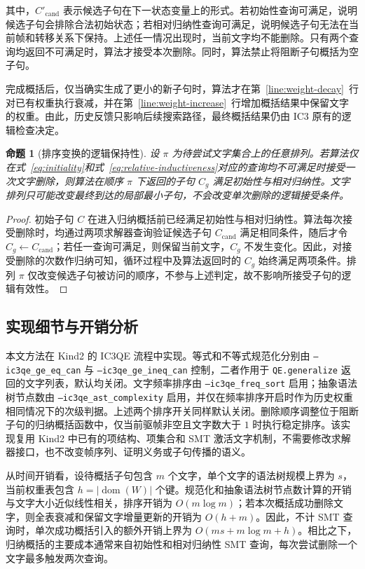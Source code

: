 \documentclass[11pt,a4paper]{article}
\newtheorem{proposition}{命题}
\begin{document}
其中，$C'_{\mathrm{cand}}$ 表示候选子句在下一状态变量上的形式。若初始性查询可满足，说明候选子句会排除合法初始状态；若相对归纳性查询可满足，说明候选子句无法在当前帧和转移关系下保持。上述任一情况出现时，当前文字均不能删除。只有两个查询均返回不可满足时，算法才接受本次删除。同时，算法禁止将阻断子句概括为空子句。

完成概括后，仅当确实生成了更小的新子句时，算法才在第~\ref{line:weight-decay}~行对已有权重执行衰减，并在第~\ref{line:weight-increase}~行增加概括结果中保留文字的权重。由此，历史反馈只影响后续搜索路径，最终概括结果仍由 IC3 原有的逻辑检查决定。

\begin{proposition}[排序变换的逻辑保持性]
设 $\pi$ 为待尝试文字集合上的任意排列。若算法仅在式~\eqref{eq:initiality}和式~\eqref{eq:relative-inductiveness}对应的查询均不可满足时接受一次文字删除，则算法在顺序 $\pi$ 下返回的子句 $C_g$ 满足初始性与相对归纳性。文字排列只可能改变最终到达的局部最小子句，不会改变单次删除的逻辑接受条件。
\end{proposition}
\begin{proof}
初始子句 $C$ 在进入归纳概括前已经满足初始性与相对归纳性。算法每次接受删除时，均通过两项求解器查询验证候选子句 $C_{\mathrm{cand}}$ 满足相同条件，随后才令 $C_g\gets C_{\mathrm{cand}}$；若任一查询可满足，则保留当前文字，$C_g$ 不发生变化。因此，对接受删除的次数作归纳可知，循环过程中及算法返回时的 $C_g$ 始终满足两项条件。排列 $\pi$ 仅改变候选子句被访问的顺序，不参与上述判定，故不影响所接受子句的逻辑有效性。
\end{proof}

\subsection{实现细节与开销分析}

本文方法在 Kind2 的 IC3QE 流程中实现。等式和不等式规范化分别由 \texttt{--ic3qe\_ge\_eq\_can} 与 \texttt{--ic3qe\_ge\_ineq\_can} 控制，二者作用于 \texttt{QE.generalize} 返回的文字列表，默认均关闭。文字频率排序由 \texttt{--ic3qe\_freq\_sort} 启用；抽象语法树节点数由 \texttt{--ic3qe\_ast\_complexity} 启用，并仅在频率排序开启时作为历史权重相同情况下的次级判据。上述两个排序开关同样默认关闭。删除顺序调整位于阻断子句的归纳概括函数中，仅当前驱帧非空且文字数大于 $1$ 时执行稳定排序。该实现复用 Kind2 中已有的项结构、项集合和 SMT 激活文字机制，不需要修改求解器接口，也不改变帧序列、证明义务或子句传播的语义。

从时间开销看，设待概括子句包含 $m$ 个文字，单个文字的语法树规模上界为 $s$，当前权重表包含 $h=|\operatorname{dom}(W)|$ 个键。规范化和抽象语法树节点数计算的开销与文字大小近似线性相关，排序开销为 $O(m\log m)$；若本次概括成功删除文字，则全表衰减和保留文字增量更新的开销为 $O(h+m)$。因此，不计 SMT 查询时，单次成功概括引入的额外开销上界为 $O(ms+m\log m+h)$。相比之下，归纳概括的主要成本通常来自初始性和相对归纳性 SMT 查询，每次尝试删除一个文字最多触发两次查询。
\end{document}

